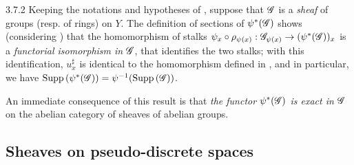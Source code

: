 \begin{env}{3.7.2}
\label{env-0.3.7.2}
Keeping the notations and hypotheses of , suppose that $\mathscr{G}$
is a \emph{sheaf} of groups (resp. of rings) on $Y$. The definition of sections
of $\psi^*(\mathscr{G})$  shows (considering ) that
the homomorphism of stalks
$\psi_x\circ\rho_{\psi(x)}:\mathscr{G}_{\psi(x)}\to(\psi^*(\mathscr{G}))_x$ is a
\emph{functorial isomorphism in $\mathscr{G}$}, that identifies the two stalks; with
this identification, $u_x^\sharp$ is identical to the homomorphism defined in
, and in particular, we have
${\mathop{\mathrm{Supp}}\nolimits}\,(\psi^*(\mathscr{G}))=\psi^{-1}({\mathop{\mathrm{Supp}}\nolimits}\,(\mathscr{G}))$.

An immediate consequence of this result is that \emph{the functor
$\psi^*(\mathscr{G})$ is exact in $\mathscr{G}$} on the abelian category of sheaves of
abelian groups.
\end{env}

\subsection{Sheaves on pseudo-discrete spaces}
\label{0-prelim-3.8}

